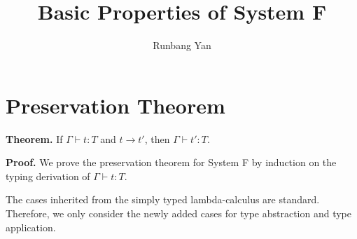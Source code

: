 \documentclass[nonacm]{acmart}
\begin{document}
\title{Basic Properties of System F}

\author{Runbang Yan}

\renewcommand{\shortauthors}{Yan}

\maketitle

\section{Preservation Theorem}

\textbf{Theorem.}
If $\Gamma \vdash t : T$ and $t \longrightarrow t'$, then $\Gamma \vdash t' : T$.

\textbf{Proof.}
We prove the preservation theorem for System F by induction on the typing derivation of $\Gamma \vdash t : T$.

The cases inherited from the simply typed lambda-calculus are standard. Therefore, we only consider the newly added cases for type abstraction and type application.
\end{document}
